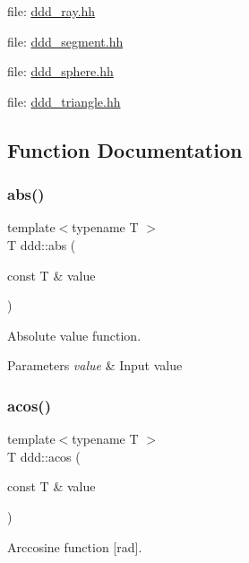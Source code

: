 file\+: \hyperlink{ddd__ray_8hh_source}{ddd\+\_\+ray.\+hh}

file\+: \hyperlink{ddd__segment_8hh_source}{ddd\+\_\+segment.\+hh}

file\+: \hyperlink{ddd__sphere_8hh_source}{ddd\+\_\+sphere.\+hh}

file\+: \hyperlink{ddd__triangle_8hh_source}{ddd\+\_\+triangle.\+hh} 

\subsection{Function Documentation}
\mbox{\label{namespaceddd_a9ac20d4240d0a9fa208e3dd220101a0a}} 
\subsubsection{\texorpdfstring{abs()}{abs()}}
{\footnotesize\ttfamily template$<$typename T $>$ \\
T ddd\+::abs (\begin{DoxyParamCaption}\item[{const T \&}]{value }\end{DoxyParamCaption})\hspace{0.3cm}{\ttfamily [inline]}}



Absolute value function. 


\begin{DoxyParams}{Parameters}
{\em value} & Input value \\
\hline
\end{DoxyParams}
\mbox{\label{namespaceddd_a03e440b351f44fec5abac1270231e3bb}} 
\subsubsection{\texorpdfstring{acos()}{acos()}}
{\footnotesize\ttfamily template$<$typename T $>$ \\
T ddd\+::acos (\begin{DoxyParamCaption}\item[{const T \&}]{value }\end{DoxyParamCaption})\hspace{0.3cm}{\ttfamily [inline]}}



Arccosine function \mbox{[}rad\mbox{]}. 


